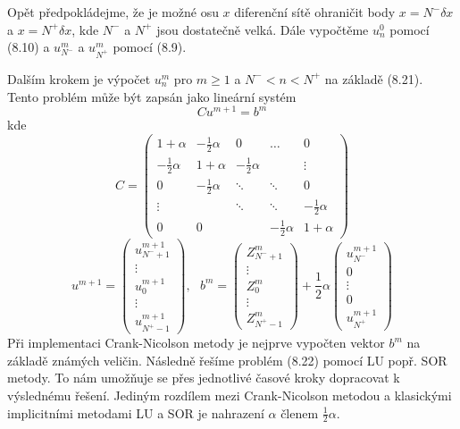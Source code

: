 \documentclass[a4paper]{book}
\begin{document}
Opět předpokládejme, že je možné osu $x$ diferenční sítě ohraničit body $x = N^{-}\delta x$ a $x = N^{+} \delta x$, kde $N^{-}$ a $N^{+}$ jsou dostatečně velká. Dále vypočtěme $u_n^0$ pomocí (8.10) a $u_{N^{-}}^m$ a $u_{N^{+}}^m$ pomocí (8.9).

Dalším krokem je výpočet $u_n^m$ pro $m \ge 1$ a $N^{-} < n < N^{+}$ na základě (8.21). Tento problém může být zapsán jako lineární systém
\begin{equation}
Cu^{m+1} = b^m
\end{equation}
kde
\begin{equation*}
	C =
	\begin{pmatrix}
		1 + \alpha & -\frac{1}{2}\alpha & 0 & \dots & 0 \\
		-\frac{1}{2}\alpha & 1 + \alpha & -\frac{1}{2}\alpha & & \vdots \\
		0 & -\frac{1}{2}\alpha & \ddots & \ddots & 0 \\
		\vdots & & \ddots & \ddots & -\frac{1}{2}\alpha \\
		0 & 0 & & -\frac{1}{2}\alpha & 1 + \alpha
	\end{pmatrix}
\end{equation*}
\begin{equation*}
	u^{m+1} =
	\begin{pmatrix}
		u_{N^{-}+1}^{m+1} \\
		\vdots \\
		u_0^{m+1} \\
		\vdots \\
		u_{N^{+}-1}^{m+1}
	\end{pmatrix}
,~~~
	b^m =
	\begin{pmatrix}
		Z_{N^{-}+1}^{m} \\
		\vdots \\
		Z_0^{m} \\
		\vdots \\
		Z_{N^{+}-1}^{m}
	\end{pmatrix}
	+ \frac{1}{2}\alpha
	\begin{pmatrix}
		u_{N^{-}}^{m+1} \\
		0 \\
		\vdots \\
		0 \\
		u_{N^{+}}^{m+1}
	\end{pmatrix}
\end{equation*}
Při implementaci Crank-Nicolson metody je nejprve vypočten vektor $b^m$ na základě známých veličin. Následně řešíme problém (8.22) pomocí LU popř. SOR metody. To nám umožňuje se přes jednotlivé časové kroky dopracovat k výslednému řešení. Jediným rozdílem mezi Crank-Nicolson metodou a klasickými implicitními metodami LU a SOR  je nahrazení $\alpha$ členem $\frac{1}{2}\alpha$.
\end{document}
